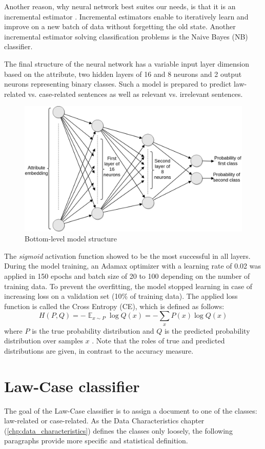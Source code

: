 \documentclass[
  digital, %
  notable,   %
  nolof,     %
  nolot,     %
]{fithesis3}
\DeclareMathOperator{\EX}{\mathbb{E}}%
\begin{document}
Another reason, why neural network best suites our needs, is that it is an incremental estimator \cite{incrementalScikit}.
Incremental estimators enable to iteratively learn and improve on a new batch of data without forgetting the old state.
Another incremental estimator solving classification problems is the Naive Bayes (NB) classifier.

The final structure of the neural network has a variable input layer dimension based on the attribute, two hidden layers of 16 and 8 neurons and 2 output neurons representing binary classes.
Such a model is prepared to predict law-related vs. case-related sentences as well as relevant vs. irrelevant sentences.

\begin{figure}[H]
\caption{Bottom-level model structure}
\label{fig:neural-network}
\includegraphics[width=\textwidth]{img/Bottom-level_NN}
\end{figure}

The \textit{sigmoid} activation function showed to be the most successful in all layers.
During the model training, an Adamax optimizer with a learning rate of 0.02 was applied in 150 epochs and batch size of 20 to 100 depending on the number of training data.
To prevent the overfitting, the model stopped learning in case of increasing loss on a validation set (10\% of training data).
The applied loss function is called the Cross Entropy (CE), which is defined as follows:
$$
H(P, Q) = -\EX_{x \sim P} \log{Q(x)} = -\sum_x P(x) \log{Q(x)}
$$
where $P$ is the true probability distribution and $Q$ is the predicted probability distribution over samples $x$ \cite{Goodfellow-et-al-2016}.
Note that the roles of true and predicted distributions are given, in contrast to the accuracy measure.

\section{Law-Case classifier}
\label{sec:law-case-classifier}
The goal of the Law-Case classifier is to assign a document to one of the classes: law-related or case-related.
As the Data Characteristics chapter (\ref{chp:data_characteristics}) defines the classes only loosely, the following paragraphs provide more specific and statistical definition.
\end{document}
